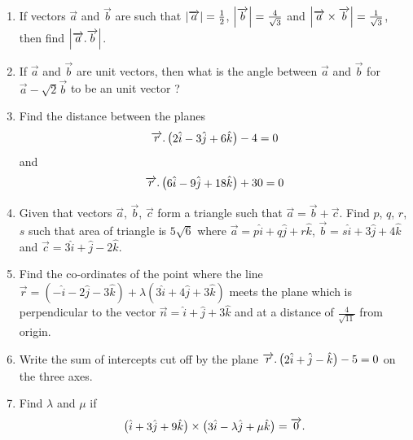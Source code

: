 \begin{enumerate}
	\item If vectors $\overrightarrow{a}$ and $\overrightarrow{b}$ are such that
 $\left\vert\overrightarrow{a}\right\vert = \frac{1}{2}$, $\left\vert\overrightarrow{b}\right\vert = \frac{4}{\sqrt{3}}$
 and $\left\vert\overrightarrow{a} \times \overrightarrow{b}\right\vert = \frac{1}{\sqrt{3}}$, then find 
 $\left\vert\overrightarrow{a}.\overrightarrow{b}\right\vert$.

	\item If $\overrightarrow{a}$ and $\overrightarrow{b}$ are unit vectors, then what is the angle between 
$\overrightarrow{a}$ and $\overrightarrow{b}$ for $\overrightarrow{a} - \sqrt{2}\overrightarrow{b}$ to be an unit vector ?
	
	\item Find the distance between the planes 
		\begin{align*}
			\overrightarrow{r}.\begin{pmatrix}2\hat{i}-3\hat{j}+6\hat{k} \end{pmatrix} - 4 =0
		\end{align*}
	and 
		\begin{align*}
			\overrightarrow{r}.\begin{pmatrix}6\hat{i}-9\hat{j} +18\hat{k}\end{pmatrix} +30 =0
		\end{align*}

	\item Given that vectors $\overrightarrow{a}$, $\overrightarrow{b}$, $\overrightarrow{c}$ form a triangle such that 
$\overrightarrow{a} = \overrightarrow{b}+\overrightarrow{c}$. Find $p$, $q$, $r$, $s$ such that area of triangle is $5\sqrt{6}$ where $\overrightarrow{a} = p\hat{i} +q\hat{j}+r\hat{k}$, 
$\overrightarrow{b} = s\hat{i} +3\hat{j}+4\hat{k}$ and $\overrightarrow{c}=3\hat{i} +\hat{j}-2\hat{k}$.
	
	\item Find the co-ordinates of the point where the line $\overrightarrow{r}=(-\hat{i}-2\hat{j}-3\hat{k})+\lambda(3\hat{i} +4\hat{j}+3\hat{k})$ meets the plane which is perpendicular to the vector $\overrightarrow{n}=\hat{i}+\hat{j} +3\hat{k}$ and at a distance of
$\frac{4}{\sqrt{11}}$ from origin.

	
	\item Write the sum of intercepts cut off by the plane $\overrightarrow{r}.\begin{pmatrix}2\hat{i}+\hat{j}-\hat{k}\end{pmatrix} - 5 = 0$ on the three axes.

	\item Find $\lambda$ and $\mu$ if
	\begin{align*}
		\begin{pmatrix}\hat{i} + 3\hat{j} + 9\hat{k}\end{pmatrix} \times \begin{pmatrix}3\hat{i} - \lambda \hat{j} + \mu \hat{k}\end{pmatrix} = \overrightarrow{0}.
	\end{align*}


\end{enumerate}
